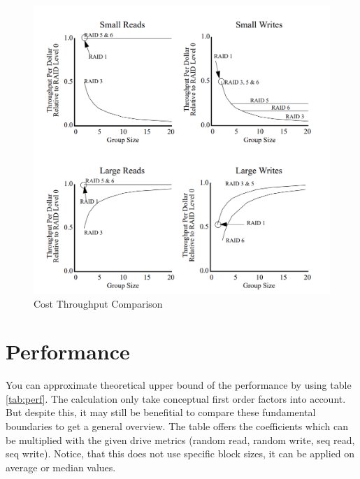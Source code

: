 \documentclass{article}
\begin{document}
\begin{figure}[h]
    \label{fig:costthroughput}
    \includegraphics[width=\textwidth]{cost-troughput-comparison}
    \caption{Cost Throughput Comparison}
\end{figure}
\pagebreak
\section{Performance}
You can approximate theoretical upper bound of the performance by using table \ref{tab:perf}.
The calculation only take conceptual first order factors into account.
But despite this, it may still be benefitial to compare these fundamental boundaries
to get a general overview. The table offers the coefficients which
can be multiplied with the given drive metrics (random read, random write, seq read, seq write).
Notice, that this does not use specific block sizes, it can be applied on
average or median values. \cite{uw:raid}
\end{document}
